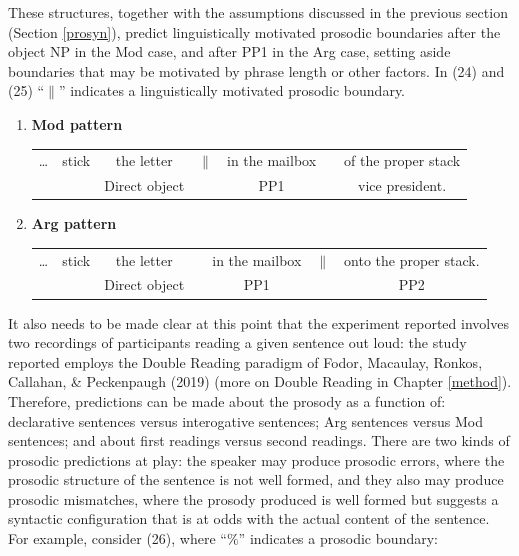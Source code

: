 \documentclass[12pt,oneside]{book}
\providecommand{\tightlist}{%
  \setlength{\itemsep}{0pt}\setlength{\parskip}{0pt}}
\begin{document}
These structures, together with the assumptions discussed in the previous section (Section \ref{prosyn}), predict linguistically motivated prosodic boundaries after the object NP in the Mod case, and after PP1 in the Arg case, setting aside boundaries that may be motivated by phrase length or other factors. In (24) and (25) ``\(\|\)'' indicates a linguistically motivated prosodic boundary.

\singlespacing

\begin{enumerate}
\def\labelenumi{(\arabic{enumi})}
\setcounter{enumi}{23}
\tightlist
\item
  \textbf{Mod pattern}
  \begingroup
  \setlength{\tabcolsep}{2pt}

  \begin{tabular}{ccccccc}
    \dots & stick & the letter & $\|$ & in the mailbox &  & of the proper stack \\
    & & \footnotesize Direct object & & \footnotesize PP1 & & \footnotesize vice president. \\
  \end{tabular}
    \endgroup
\item
  \textbf{Arg pattern}
  \begingroup
  \setlength{\tabcolsep}{2pt}

  \begin{tabular}{ccccccc}
    \dots & stick & the letter & & in the mailbox & $\|$ & onto the proper stack. \\
    & & \footnotesize Direct object & & \footnotesize PP1 & & \footnotesize PP2 \\
  \end{tabular}
    \endgroup
\end{enumerate}

\doublespacing

It also needs to be made clear at this point that the experiment reported involves two recordings of participants reading a given sentence out loud: the study reported employs the Double Reading paradigm of Fodor, Macaulay, Ronkos, Callahan, \& Peckenpaugh (2019) (more on Double Reading in Chapter \ref{method}). Therefore, predictions can be made about the prosody as a function of: declarative sentences versus interogative sentences; Arg sentences versus Mod sentences; and about first readings versus second readings. There are two kinds of prosodic predictions at play: the speaker may produce prosodic errors, where the prosodic structure of the sentence is not well formed, and they also may produce prosodic mismatches, where the prosody produced is well formed but suggests a syntactic configuration that is at odds with the actual content of the sentence. For example, consider (26), where ``\(\%\)'' indicates a prosodic boundary:
\end{document}
